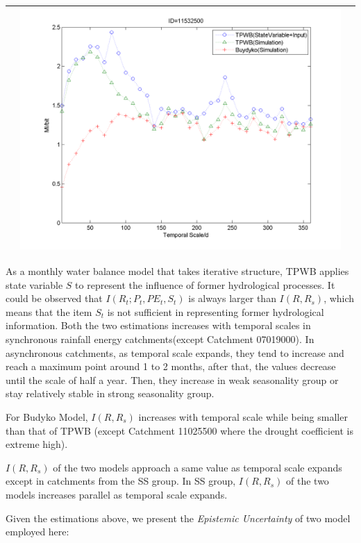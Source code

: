 \documentclass[11pt]{article}
\begin{document}
\begin{table}[H]
{\begin{tabular}{ccc}
&\begin{minipage}{.6\textwidth}\includegraphics[width=\linewidth]{resultgraph/11532500MI.png}\end{minipage}
\\
\bottomrule
\end{tabular}
}
\end{table}


As a monthly water balance model that takes  iterative structure, TPWB applies state variable $S$ to represent the influence of former hydrological processes. It could be observed that $I(R_t;P_t,PE_t,S_t)$ is always larger than $I(R,R_s)$, which means that the item $S_t$ is not sufficient in representing former hydrological information. Both the two estimations increases with temporal scales in synchronous rainfall energy catchments(except Catchment 07019000). In asynchronous catchments, as temporal scale expands, they tend to increase and reach a maximum point  around 1 to 2 months, after that, the values decrease until the scale of half a year. Then, they increase in weak seasonality group or stay relatively stable in strong seasonality group.

For Budyko Model, $I(R,R_s)$ increases  with temporal scale while being smaller than that of TPWB (except Catchment 11025500 where the drought coefficient is extreme high). 

$I(R,R_s)$ of the two models approach a same value as temporal scale expands except in catchments from the SS group. In SS group, $I(R,R_s)$ of the two models increases parallel as temporal scale expands. 

Given the estimations above, we present the \emph{Epistemic Uncertainty} of two model employed here:
\end{document}
